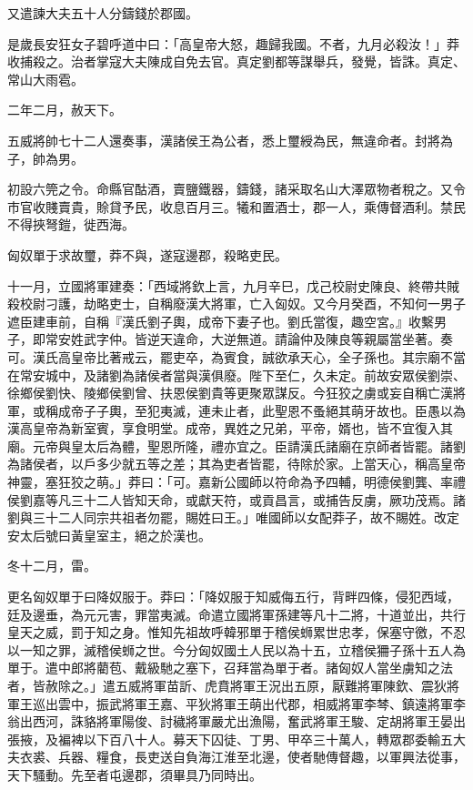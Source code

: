 \begin{pinyinscope}
又遣諫大夫五十人分鑄錢於郡國。

是歲長安狂女子碧呼道中曰：「高皇帝大怒，趣歸我國。不者，九月必殺汝！」莽收捕殺之。治者掌寇大夫陳成自免去官。真定劉都等謀舉兵，發覺，皆誅。真定、常山大雨雹。

二年二月，赦天下。

五威將帥七十二人還奏事，漢諸侯王為公者，悉上璽綬為民，無違命者。封將為子，帥為男。

初設六筦之令。命縣官酤酒，賣鹽鐵器，鑄錢，諸采取名山大澤眾物者稅之。又令市官收賤賣貴，賒貸予民，收息百月三。犧和置酒士，郡一人，乘傳督酒利。禁民不得挾弩鎧，徙西海。

匈奴單于求故璽，莽不與，遂寇邊郡，殺略吏民。

十一月，立國將軍建奏：「西域將欽上言，九月辛巳，戊己校尉史陳良、終帶共賊殺校尉刁護，劫略吏士，自稱廢漢大將軍，亡入匈奴。又今月癸酉，不知何一男子遮臣建車前，自稱『漢氏劉子輿，成帝下妻子也。劉氏當復，趣空宮。』收繫男子，即常安姓武字仲。皆逆天違命，大逆無道。請論仲及陳良等親屬當坐著。奏可。漢氏高皇帝比著戒云，罷吏卒，為賓食，誠欲承天心，全子孫也。其宗廟不當在常安城中，及諸劉為諸侯者當與漢俱廢。陛下至仁，久未定。前故安眾侯劉崇、徐鄉侯劉快、陵鄉侯劉曾、扶恩侯劉貴等更聚眾謀反。今狂狡之虜或妄自稱亡漢將軍，或稱成帝子子輿，至犯夷滅，連未止者，此聖恩不蚤絕其萌牙故也。臣愚以為漢高皇帝為新室賓，享食明堂。成帝，異姓之兄弟，平帝，婿也，皆不宜復入其廟。元帝與皇太后為體，聖恩所隆，禮亦宜之。臣請漢氏諸廟在京師者皆罷。諸劉為諸侯者，以戶多少就五等之差；其為吏者皆罷，待除於家。上當天心，稱高皇帝神靈，塞狂狡之萌。」莽曰：「可。嘉新公國師以符命為予四輔，明德侯劉龔、率禮侯劉嘉等凡三十二人皆知天命，或獻天符，或貢昌言，或捕告反虜，厥功茂焉。諸劉與三十二人同宗共祖者勿罷，賜姓曰王。」唯國師以女配莽子，故不賜姓。改定安太后號曰黃皇室主，絕之於漢也。

冬十二月，雷。

更名匈奴單于曰降奴服于。莽曰：「降奴服于知威侮五行，背畔四條，侵犯西域，廷及邊垂，為元元害，罪當夷滅。命遣立國將軍孫建等凡十二將，十道並出，共行皇天之威，罰于知之身。惟知先祖故呼韓邪單于稽侯蛳累世忠孝，保塞守徼，不忍以一知之罪，滅稽侯蛳之世。今分匈奴國土人民以為十五，立稽侯狦子孫十五人為單于。遣中郎將藺苞、戴級馳之塞下，召拜當為單于者。諸匈奴人當坐虜知之法者，皆赦除之。」遣五威將軍苗訢、虎賁將軍王況出五原，厭難將軍陳欽、震狄將軍王巡出雲中，振武將軍王嘉、平狄將軍王萌出代郡，相威將軍李棽、鎮遠將軍李翁出西河，誅貉將軍陽俊、討穢將軍嚴尤出漁陽，奮武將軍王駿、定胡將軍王晏出張掖，及褊裨以下百八十人。募天下囚徒、丁男、甲卒三十萬人，轉眾郡委輸五大夫衣裘、兵器、糧食，長吏送自負海江淮至北邊，使者馳傳督趣，以軍興法從事，天下騷動。先至者屯邊郡，須畢具乃同時出。


\end{pinyinscope}
